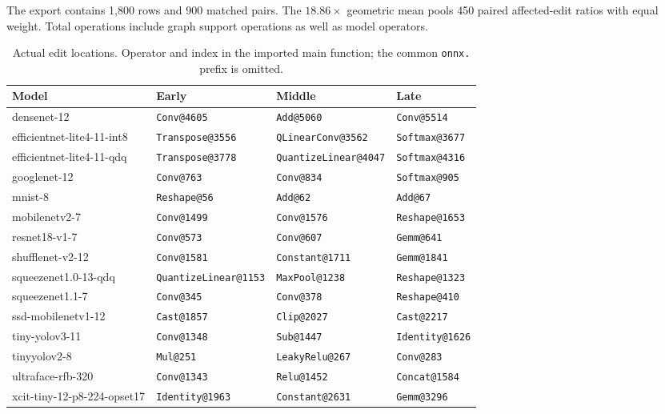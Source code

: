 The export contains 1,800 rows and 900 matched pairs. The $18.86\times$
geometric mean pools 450 paired affected-edit ratios with equal weight.
Total operations include graph support operations as well as model operators.

\begin{table}[!htbp]
\centering\scriptsize
\caption{Actual edit locations. Operator and index in the imported main function;
the common \texttt{onnx.} prefix is omitted.}
\label{tab:retained-sites}
\setlength{\tabcolsep}{3pt}
\begin{tabular*}{\textwidth}{@{\extracolsep{\fill}}llll@{}}
\toprule Model & Early & Middle & Late \\
\midrule
densenet-12 & \texttt{Conv@4605} & \texttt{Add@5060} & \texttt{Conv@5514} \\
efficientnet-lite4-11-int8 & \texttt{Transpose@3556} & \texttt{QLinearConv@3562} & \texttt{Softmax@3677} \\
efficientnet-lite4-11-qdq & \texttt{Transpose@3778} & \texttt{QuantizeLinear@4047} & \texttt{Softmax@4316} \\
googlenet-12 & \texttt{Conv@763} & \texttt{Conv@834} & \texttt{Softmax@905} \\
mnist-8 & \texttt{Reshape@56} & \texttt{Add@62} & \texttt{Add@67} \\
mobilenetv2-7 & \texttt{Conv@1499} & \texttt{Conv@1576} & \texttt{Reshape@1653} \\
resnet18-v1-7 & \texttt{Conv@573} & \texttt{Conv@607} & \texttt{Gemm@641} \\
shufflenet-v2-12 & \texttt{Conv@1581} & \texttt{Constant@1711} & \texttt{Gemm@1841} \\
squeezenet1.0-13-qdq & \texttt{QuantizeLinear@1153} & \texttt{MaxPool@1238} & \texttt{Reshape@1323} \\
squeezenet1.1-7 & \texttt{Conv@345} & \texttt{Conv@378} & \texttt{Reshape@410} \\
ssd-mobilenetv1-12 & \texttt{Cast@1857} & \texttt{Clip@2027} & \texttt{Cast@2217} \\
tiny-yolov3-11 & \texttt{Conv@1348} & \texttt{Sub@1447} & \texttt{Identity@1626} \\
tinyyolov2-8 & \texttt{Mul@251} & \texttt{LeakyRelu@267} & \texttt{Conv@283} \\
ultraface-rfb-320 & \texttt{Conv@1343} & \texttt{Relu@1452} & \texttt{Concat@1584} \\
xcit-tiny-12-p8-224-opset17 & \texttt{Identity@1963} & \texttt{Constant@2631} & \texttt{Gemm@3296} \\
\bottomrule\end{tabular*}\end{table}
